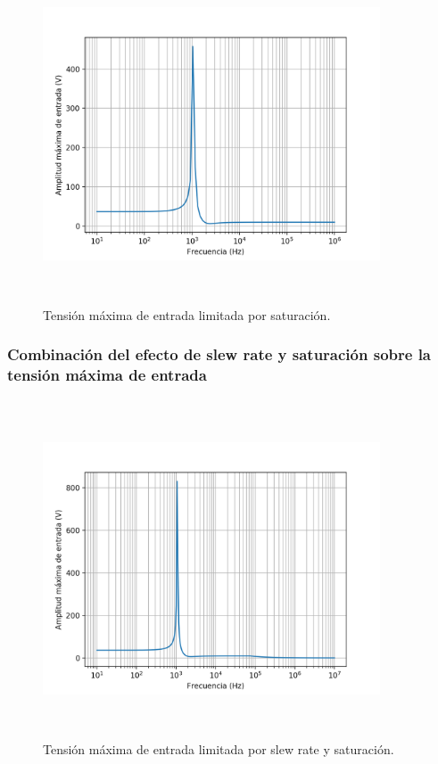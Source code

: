 \begin{figure}[H] %
	\centering
	\includegraphics[width=10cm,height=10cm,keepaspectratio]{../EJ1/00GRAFICOS/vinmaxsat.png}
	\caption{Tensi\'on m\'axima de entrada limitada por saturaci\'on.}
	\label{vinmaxsat}
\end{figure}

\subsubsection*{Combinaci\'on del efecto de slew rate y saturaci\'on sobre la tensi\'on m\'axima de entrada}


\begin{figure}[H] %
	\centering
	\includegraphics[width=10cm,height=10cm,keepaspectratio]{../EJ1/00GRAFICOS/vinmaxtotal.png}
	\caption{Tensi\'on m\'axima de entrada limitada por slew rate y saturaci\'on.}
	\label{vinmaxtotal}
\end{figure}


